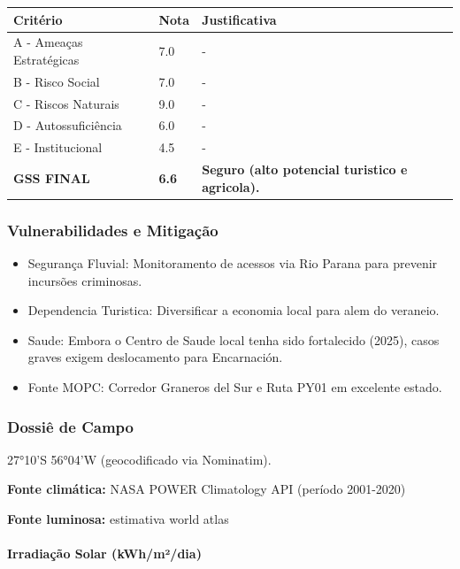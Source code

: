 \begin{table}[ht!]
\small \begin{tabular}{p{3.0cm}p{0.8cm}p{6.0cm}} \toprule
\textbf{Critério} & \textbf{Nota} & \textbf{Justificativa} \\ \midrule
A - Ameaças Estratégicas & 7.0 & - \\
B - Risco Social & 7.0 & - \\
C - Riscos Naturais & 9.0 & - \\
D - Autossuficiência & 6.0 & - \\
E - Institucional & 4.5 & - \\
\midrule \textbf{GSS FINAL} & \textbf{6.6} & \textbf{Seguro (alto potencial turistico e agricola).} \\ \bottomrule \end{tabular}
\end{table}
\subsubsection{Vulnerabilidades e
Mitigação}

\begin{itemize}
\item
  Segurança Fluvial: Monitoramento de acessos via Rio Parana para
  prevenir incursões criminosas.
\item
  Dependencia Turistica: Diversificar a economia local para alem do
  veraneio.
\item
  Saude: Embora o Centro de Saude local tenha sido fortalecido (2025),
  casos graves exigem deslocamento para Encarnación.
\item
  Fonte MOPC: Corredor Graneros del Sur e Ruta PY01 em excelente estado.
\end{itemize}
\subsubsection{Dossiê de Campo}
\begin{description}[style=nextline,leftmargin=0.5cm,font=\bfseries]
\item[Coordenadas]  27°10'S 56°04'W (geocodificado via Nominatim).
\end{description}
\textbf{Fonte climática:} NASA POWER Climatology API (período 2001-2020)

\textbf{Fonte luminosa:} estimativa world atlas

\paragraph{Irradiação Solar
(kWh/\allowbreak m²/\allowbreak dia)}

